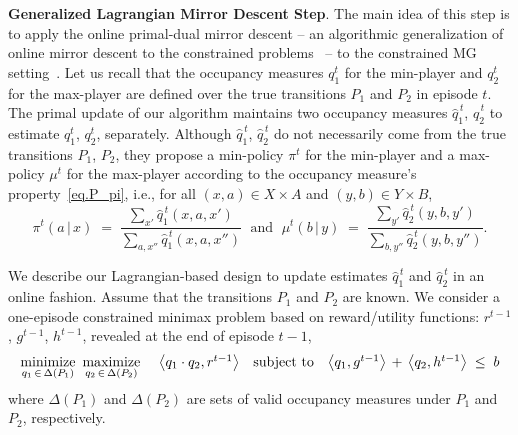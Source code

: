 \documentclass[12pt, final]{l4dc2023}
\begin{document}
\noindent\textbf{Generalized Lagrangian Mirror Descent Step}. The main idea of this step is to apply the online primal-dual mirror descent -- an algorithmic generalization of online mirror descent to the constrained problems~\citep{wei2020online}  -- to the constrained MG setting~\citep{altman2000constrained,altman2005zero,altman2008constrained,singh2014characterization}. Let us recall that the occupancy measures $q_1^t$ for the min-player and $q_2^t$ for the max-player are defined over the true transitions $P_1$ and $P_2$ in episode $t$. The primal update of our algorithm maintains two occupancy measures $\hat q_1^{\,t}$, $\hat q_2^{\,t}$ to estimate $q_1^t$, $q_2^t$, separately. Although $\hat q_1^{\,t}$, $\hat q_2^{\,t}$ do not necessarily come from the true transitions $P_1$, $P_2$, they propose a min-policy $\pi^t$ for the min-player and a max-policy $\mu^t$ for the max-player according to the occupancy measure's property~\eqref{eq.P_pi}, i.e., for all $(x,a) \in X\times A$ and $(y,b)\in Y\times B$,
\begin{equation}\label{eq.policy}
\pi^t(a\,\vert\,x) \;=\; \frac{\underset{x'}{\sum} \hat{q}_1^{\,t}(x,a,x')}{\underset{a,x''}{\sum} \hat q_1^{\,t}(x,a,x'') }
\; \text{ and }\;
\mu^t(b\,\vert\,y) \;=\; \frac{\underset{y'}{\sum} \hat q_2^{\,t}(y,b,y')}{\underset{b,y''}{\sum} \hat q_2^{\,t}(y,b,y'') }.
\end{equation}

We describe our Lagrangian-based design to update estimates $\hat q_1^{\,t}$ and $\hat q_2^{\,t}$ in an online fashion. 
Assume that the transitions $P_1$ and $P_2$ are known. We consider a one-episode constrained minimax problem based on reward/utility functions: $r^{t-1}$, $g^{t-1}$, $h^{t-1}$, revealed at the end of episode $t-1$,
\[
\begin{array}{rcl}
\operatorname*{minimize}\limits_{q_1\,\in\,\Delta(P_1)} \,\,\operatorname*{maximize}\limits_{q_2\,\in\,\Delta(P_2)}
&& \!\!\!\! \left\langle q_1\cdot q_2,r^{t-1} \right\rangle
\;\;\; \operatorname*{subject~to} \;\;\;
\left\langle q_1,g^{t-1} \right\rangle \,+\,\left\langle q_2,h^{t-1} \right\rangle \;\leq\; b
\end{array}
\]
where $\Delta(P_1)$ and $\Delta(P_2)$ are sets of valid occupancy measures under $P_1$ and $P_2$, respectively. 
\end{document}
